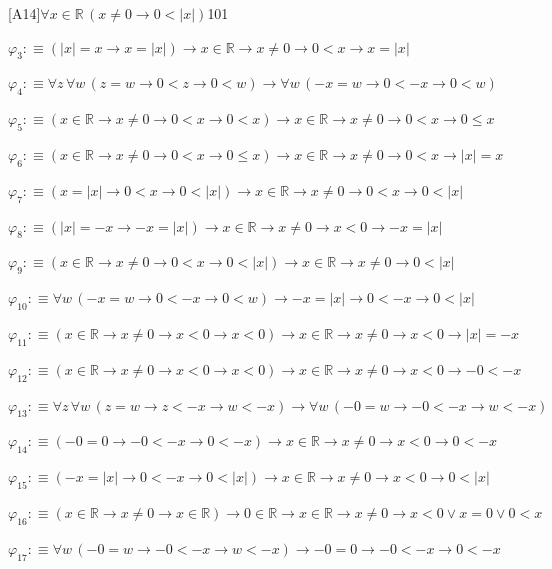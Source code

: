 \begin{fullproof}{[A14]}{$\forall x \in \mathbb{R}\,(x \neq 0 \to 0 < \lvert x \rvert)$}{101}
\begin{abbrevlist}
\item $\varphi_{3} :\equiv (\lvert x \rvert = x \to x = \lvert x \rvert) \to x \in \mathbb{R} \to x \neq 0 \to 0 < x \to x = \lvert x \rvert$
\item $\varphi_{4} :\equiv \forall z\,\forall w\,(z = w \to 0 < z \to 0 < w) \to \forall w\,(-x = w \to 0 < -x \to 0 < w)$
\item $\varphi_{5} :\equiv (x \in \mathbb{R} \to x \neq 0 \to 0 < x \to 0 < x) \to x \in \mathbb{R} \to x \neq 0 \to 0 < x \to 0 \leq x$
\item $\varphi_{6} :\equiv (x \in \mathbb{R} \to x \neq 0 \to 0 < x \to 0 \leq x) \to x \in \mathbb{R} \to x \neq 0 \to 0 < x \to \lvert x \rvert = x$
\item $\varphi_{7} :\equiv (x = \lvert x \rvert \to 0 < x \to 0 < \lvert x \rvert) \to x \in \mathbb{R} \to x \neq 0 \to 0 < x \to 0 < \lvert x \rvert$
\item $\varphi_{8} :\equiv (\lvert x \rvert = -x \to -x = \lvert x \rvert) \to x \in \mathbb{R} \to x \neq 0 \to x < 0 \to -x = \lvert x \rvert$
\item $\varphi_{9} :\equiv (x \in \mathbb{R} \to x \neq 0 \to 0 < x \to 0 < \lvert x \rvert) \to x \in \mathbb{R} \to x \neq 0 \to 0 < \lvert x \rvert$
\item $\varphi_{10} :\equiv \forall w\,(-x = w \to 0 < -x \to 0 < w) \to -x = \lvert x \rvert \to 0 < -x \to 0 < \lvert x \rvert$
\item $\varphi_{11} :\equiv (x \in \mathbb{R} \to x \neq 0 \to x < 0 \to x < 0) \to x \in \mathbb{R} \to x \neq 0 \to x < 0 \to \lvert x \rvert = -x$
\item $\varphi_{12} :\equiv (x \in \mathbb{R} \to x \neq 0 \to x < 0 \to x < 0) \to x \in \mathbb{R} \to x \neq 0 \to x < 0 \to -0 < -x$
\item $\varphi_{13} :\equiv \forall z\,\forall w\,(z = w \to z < -x \to w < -x) \to \forall w\,(-0 = w \to -0 < -x \to w < -x)$
\item $\varphi_{14} :\equiv (-0 = 0 \to -0 < -x \to 0 < -x) \to x \in \mathbb{R} \to x \neq 0 \to x < 0 \to 0 < -x$
\item $\varphi_{15} :\equiv (-x = \lvert x \rvert \to 0 < -x \to 0 < \lvert x \rvert) \to x \in \mathbb{R} \to x \neq 0 \to x < 0 \to 0 < \lvert x \rvert$
\item $\varphi_{16} :\equiv (x \in \mathbb{R} \to x \neq 0 \to x \in \mathbb{R}) \to 0 \in \mathbb{R} \to x \in \mathbb{R} \to x \neq 0 \to x < 0 \lor x = 0 \lor 0 < x$
\item $\varphi_{17} :\equiv \forall w\,(-0 = w \to -0 < -x \to w < -x) \to -0 = 0 \to -0 < -x \to 0 < -x$

\end{abbrevlist}
\end{fullproof}
